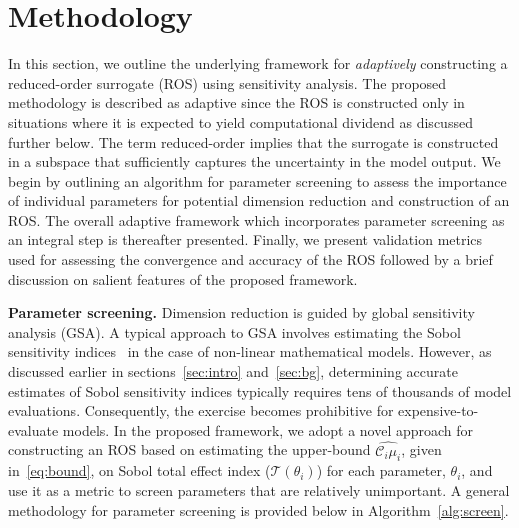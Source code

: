 \section{Methodology}
\label{sec:method}

%

In this section, we outline the underlying framework for \emph{adaptively}
constructing a reduced-order surrogate (ROS) using sensitivity analysis.  The
proposed methodology is described as adaptive since the ROS is constructed only
in situations where it is expected to yield computational dividend as discussed
further below.  The term reduced-order implies that the surrogate is
constructed in a subspace that sufficiently captures the uncertainty in the
model output. We begin by outlining an algorithm for parameter screening
to assess the importance of individual parameters for potential dimension
reduction and construction of an ROS. The overall adaptive framework 
which incorporates parameter screening as an integral step is thereafter
presented. Finally, we present validation metrics used for assessing the
convergence and accuracy of the ROS followed by a brief discussion on
salient features of the proposed framework. 

\textbf{Parameter screening.}
Dimension reduction is guided by global sensitivity analysis (GSA).  A typical
approach to GSA involves estimating the Sobol sensitivity
indices~\cite{Sobol:2001} in the case of non-linear mathematical models.
However, as discussed earlier in sections~\ref{sec:intro} and~\ref{sec:bg},
determining accurate estimates of Sobol sensitivity indices typically requires
tens of thousands of model evaluations. Consequently, the exercise becomes
prohibitive for expensive-to-evaluate models.  In the proposed framework, we
adopt a novel approach for constructing an ROS based on estimating the
upper-bound $\widehat{\mathcal{C}_i\mu_i}$, given in~\eqref{eq:bound}, on 
Sobol total effect index ($\mathcal{T}(\theta_i)$) for each 
parameter, $\theta_i$, and use it as a metric to screen 
parameters that are relatively unimportant. A general
methodology for parameter screening is provided below in
Algorithm~\ref{alg:screen}.

